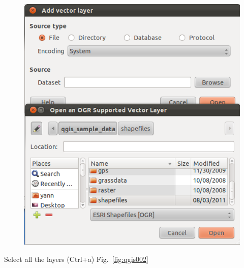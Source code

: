 \begin{figure}[htbp]
   \centering
   \includegraphics[scale=0.3]{qgis001.png}
   \caption{}
   \label{fig:qgis001}
\end{figure}

Select all the layers (Ctrl+a) Fig.~\ref{fig:qgis002}

